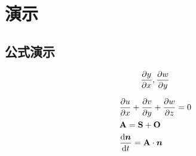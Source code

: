 \chapter{演示}
\vspace{7pt}
\section{公式演示}
\begin{equation}
	\ppx{y}, \ppx[y]{w}
\end{equation}

\begin{equation}
	\begin{split}
		&\ppx{u}+\ppx[y]{v}+\ppx[z]{w}=0\\
		&\ma A=\ma S+\ma O\\
		&\dt{\ve n}=\ma A \cdot \ve n
	\end{split}
\end{equation}